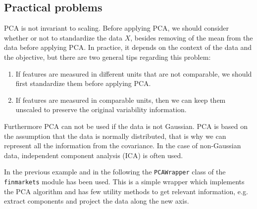 \subsection{Practical problems}
PCA is not invariant to scaling. Before applying PCA, we should consider whether or not to standardize the data $X$, besides removing of the mean from the data before applying PCA. In practice, it depends on the context of the data and the objective, but there are two general tips regarding this problem:
\begin{enumerate}
	\item If features are measured in different units that are not comparable, we should first standardize them before applying PCA.
	\item If features are measured in comparable units, then we can keep them unscaled to preserve the original variability information.
\end{enumerate}

Furthermore PCA can not be used if the data is not Gaussian. PCA is based on the assumption that the data is normally distributed, that is why we can represent all the information from the covariance. In the case of non-Gaussian data, independent component analysis (ICA) is often used.

\begin{finmarkets}
In the previous example and in the following the \texttt{PCAWrapper} class of the \texttt{finmarkets} module has been used. 
This is a simple wrapper which implements the PCA algorithm and has few utility methods to get relevant information, e.g. extract components and project the data along the new axis.
\end{finmarkets}


